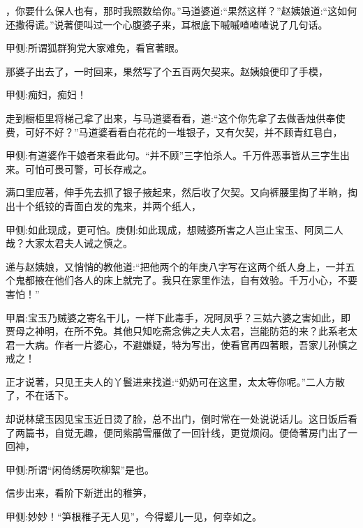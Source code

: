 \begin{parag}
，你要什么保人也有，那时我照数给你。”马道婆道:“果然这样？”赵姨娘道:“这如何还撒得谎。”说著便叫过一个心腹婆子来，耳根底下嘁嘁喳喳喳说了几句话。\begin{note}甲侧:所谓狐群狗党大家难免，看官著眼。\end{note}那婆子出去了，一时回来，果然写了个五百两欠契来。赵姨娘便印了手模，\begin{note}甲侧:痴妇，痴妇！\end{note}走到橱柜里将梯己拿了出来，与马道婆看看，道:“这个你先拿了去做香烛供奉使费，可好不好？”马道婆看看白花花的一堆银子，又有欠契，并不顾青红皂白，\begin{note}甲侧:有道婆作干娘者来看此句。“并不顾”三字怕杀人。千万件恶事皆从三字生出来。可怕可畏可警，可长存戒之。\end{note}满口里应著，伸手先去抓了银子掖起来，然后收了欠契。又向裤腰里掏了半晌，掏出十个纸铰的青面白发的鬼来，并两个纸人，\begin{note}甲侧:如此现成，更可怕。庚侧:如此现成，想贼婆所害之人岂止宝玉、阿凤二人哉？大家太君夫人诫之慎之。\end{note}递与赵姨娘，又悄悄的教他道:“把他两个的年庚八字写在这两个纸人身上，一并五个鬼都掖在他们各人的床上就完了。我只在家里作法，自有效验。千万小心，不要害怕！”\begin{note}甲眉:宝玉乃贼婆之寄名干儿，一样下此毒手，况阿凤乎？三姑六婆之害如此，即贾母之神明，在所不免。其他只知吃斋念佛之夫人太君，岂能防范的来？此系老太君一大病。作者一片婆心，不避嫌疑，特为写出，使看官再四著眼，吾家儿孙慎之戒之！\end{note}正才说著，只见王夫人的丫鬟进来找道:“奶奶可在这里，太太等你呢。”二人方散了，不在话下。
\end{parag}


\begin{parag}
    却说林黛玉因见宝玉近日烫了脸，总不出门，倒时常在一处说说话儿。这日饭后看了两篇书，自觉无趣，便同紫鹃雪雁做了一回针线，更觉烦闷。便倚著房门出了一回神，\begin{note}甲侧:所谓“闲倚绣房吹柳絮”是也。\end{note}信步出来，看阶下新迸出的稚笋，\begin{note}甲侧:妙妙！“笋根稚子无人见”，今得颦儿一见，何幸如之。\end{note}
\end{parag}


